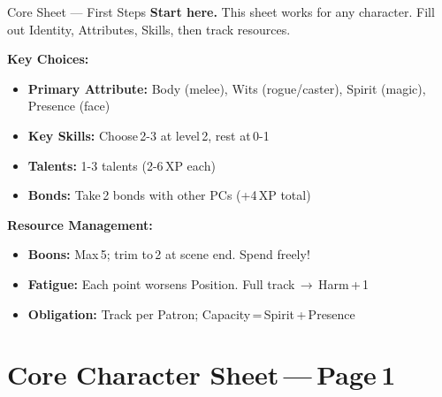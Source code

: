 \documentclass[10pt]{article}
\begin{document}
\begin{tipbox}{Core Sheet --- First Steps}
    \textbf{Start here.} This sheet works for any character. Fill out Identity, Attributes, Skills, then track resources.
    
    \textbf{Key Choices:}
    \begin{itemize}
        \item \textbf{Primary Attribute:} Body (melee), Wits (rogue/caster), Spirit (magic), Presence (face)
        \item \textbf{Key Skills:} Choose 2-3 at level 2, rest at 0-1
        \item \textbf{Talents:} 1-3 talents (2-6 XP each)
        \item \textbf{Bonds:} Take 2 bonds with other PCs (+4 XP total)
    \end{itemize}
    
    \textbf{Resource Management:}
    \begin{itemize}
        \item \textbf{Boons:} Max 5; trim to 2 at scene end. Spend freely!
        \item \textbf{Fatigue:} Each point worsens Position. Full track $\rightarrow$ Harm + 1
        \item \textbf{Obligation:} Track per Patron; Capacity = Spirit + Presence
    \end{itemize}
\end{tipbox}
\newpage

\section*{Core Character Sheet --- Page 1}
\end{document}
